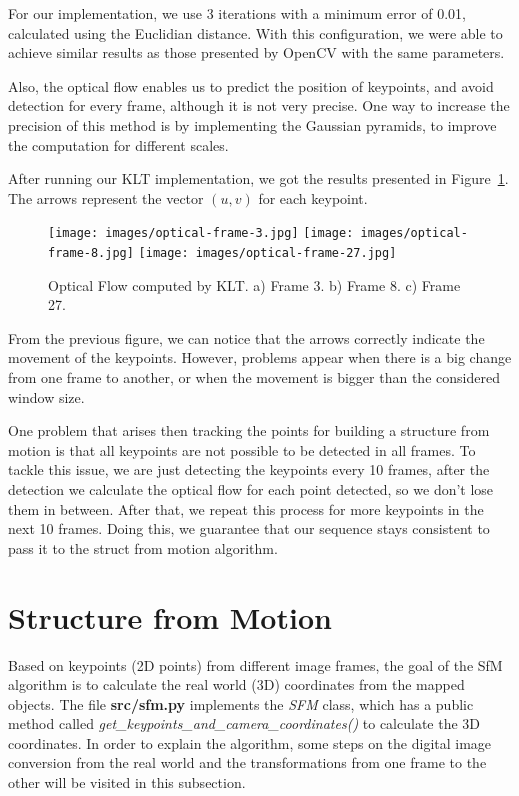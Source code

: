 \documentclass[]{IEEEtran}
\begin{document}
For our implementation, we use 3 iterations with a minimum error of 0.01, calculated using the Euclidian distance. With this configuration, we were able to achieve similar results as those presented by OpenCV with the same parameters.

Also, the optical flow enables us to predict the position of keypoints, and avoid detection for every frame, although it is not very precise. One way to increase the precision of this method is by implementing the Gaussian pyramids, to improve the computation for different scales.

After running our KLT implementation, we got the results presented in Figure~\ref{fig:optical-flow}. The arrows represent the vector $(u, v)$ for each keypoint.

\begin{figure}[H]
    \centering
    \texttt{[image: images/optical-frame-3.jpg]}
    \texttt{[image: images/optical-frame-8.jpg]}
    \texttt{[image: images/optical-frame-27.jpg]}
    \caption{Optical Flow computed by KLT. a) Frame 3. b) Frame 8. c) Frame 27.}
    \label{fig:optical-flow}
\end{figure}

From the previous figure, we can notice that the arrows correctly indicate the movement of the keypoints. However, problems appear when there is a big change from one frame to another, or when the movement is bigger than the considered window size.

One problem that arises then tracking the points for building a structure from motion is that all keypoints are not possible to be detected in all frames. To tackle this issue, we are just detecting the keypoints every 10 frames, after the detection we calculate the optical flow for each point detected, so we don't lose them in between. After that, we repeat this process for more keypoints in the next 10 frames. Doing this, we guarantee that our sequence stays consistent to pass it to the struct from motion algorithm.

\section{Structure from Motion}
\label{sec:sfm}
Based on keypoints (2D points) from different image frames, the goal of the SfM algorithm is to calculate the real world (3D) coordinates from the mapped objects. The file \textbf{src/sfm.py} implements the \textit{SFM} class, which has a public method called \textit{get\_keypoints\_and\_camera\_coordinates()} to calculate the 3D coordinates. In order to explain the algorithm, some steps on the digital image conversion from the real world and the transformations from one frame to the other will be visited in this subsection.
\end{document}
